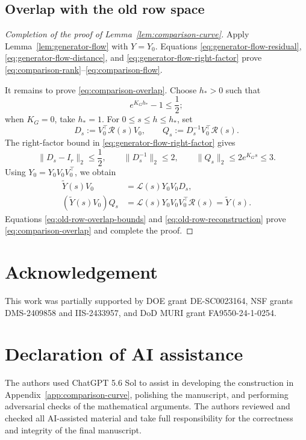 \documentclass[]{article}
\numberwithin{equation}{section}
\theoremstyle{plain}
\theoremstyle{remark}
\numberwithin{algorithm}{section}
\begin{document}
\subsection{Overlap with the old row space}
\label{app:old-row-overlap}

\begin{proof}[Completion of the proof of Lemma~\ref{lem:comparison-curve}]
Apply Lemma~\ref{lem:generator-flow} with \(Y=Y_0\).  Equations
\eqref{eq:generator-flow-residual},
\eqref{eq:generator-flow-distance}, and
\eqref{eq:generator-flow-right-factor} prove
\eqref{eq:comparison-rank}--\eqref{eq:comparison-flow}.

It remains to prove \eqref{eq:comparison-overlap}.  Choose \(h_*>0\) such that
\begin{equation}\label{eq:comparison-hstar}
 e^{K_Gh_*}-1\le\frac12;
\end{equation}
when \(K_G=0\), take \(h_*=1\).  For \(0\le s\le h\le h_*\), set
\begin{equation}\label{eq:old-row-overlap-matrices}
 D_s:=V_0^\top\mathcal R(s)V_0,
 \qquad
 Q_s:=D_s^{-1}V_0^\top\mathcal R(s).
\end{equation}
The right-factor bound in \eqref{eq:generator-flow-right-factor} gives
\begin{equation}\label{eq:old-row-overlap-bounds}
 \|D_s-I_r\|_2\le\frac12,
 \qquad
 \|D_s^{-1}\|_2\le2,
 \qquad
 \|Q_s\|_2\le2e^{K_Gs}\le3.
\end{equation}
Using \(Y_0=Y_0V_0V_0^\top\), we obtain
\begin{align}
 \widetilde Y(s)V_0
 &=\mathcal L(s)Y_0V_0 D_s,                              \label{eq:old-row-product}\\
 (\widetilde Y(s)V_0)Q_s
 &=\mathcal L(s)Y_0V_0V_0^\top\mathcal R(s)
  =\widetilde Y(s).                                  \label{eq:old-row-reconstruction}
\end{align}
Equations \eqref{eq:old-row-overlap-bounds} and
\eqref{eq:old-row-reconstruction} prove
\eqref{eq:comparison-overlap} and complete the proof.
\end{proof}

\section*{Acknowledgement}

This work was partially supported by DOE grant DE-SC0023164, NSF grants DMS-2409858 and IIS-2433957, and DoD MURI grant FA9550-24-1-0254.

\section*{Declaration of AI assistance}
The authors used ChatGPT 5.6 Sol to assist in developing the construction
in Appendix~\ref{app:comparison-curve}, polishing the manuscript, and
performing adversarial checks of the mathematical arguments.  The authors
reviewed and checked all AI-assisted material and take full responsibility
for the correctness and integrity of the final manuscript.



\begingroup


\endgroup
\end{document}
